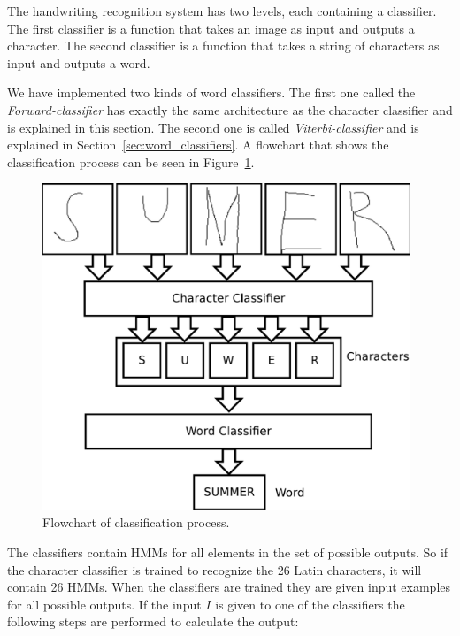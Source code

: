 
The handwriting recognition system has two levels, each containing a classifier. 
The first classifier is a function that takes an image as input and outputs a character. 
The second classifier is a function that takes a string of characters as input and outputs a word.

We have implemented two kinds of word classifiers.
The first one called the \emph{Forward-classifier} has exactly the same architecture as the character classifier and is explained in this section.
The second one is called \emph{Viterbi-classifier} and is explained in Section~\ref{sec:word_classifiers}.
A flowchart that shows the classification process can be seen in Figure~\ref{fig:classification_system_overview}. 

    \begin{figure}[htb] 
      \begin{center}
	\leavevmode
	\includegraphics[width=110mm]{classification_system_overview.pdf}%
      \end{center}
      \caption{Flowchart of classification process.}
      \label{fig:classification_system_overview}
    \end{figure}

The classifiers contain HMMs for all elements in the set of possible outputs. 
So if the character classifier is trained to recognize the 26 Latin characters, it will contain 26 HMMs. 
When the classifiers are trained they are given input examples for all possible outputs. 
If the input $I$ is given to one of the classifiers the following steps are performed to calculate the output:

